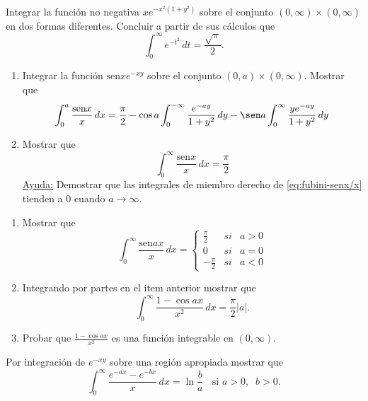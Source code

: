 \documentclass{book}
\begin{document}
\begin{ejer}{} 
Integrar la función no negativa $xe^{-x^2(1+y^2)}$ sobre el conjunto $(0,\infty)\times (0,\infty)$
en dos formas diferentes. Concluir a partir de sus cálculos que 
\[
\int_0^{\infty} e^{-t^2}\,dt=\frac{\sqrt{\pi}}{2}.
\]
\end{ejer}


\begin{ejer}{} 
\begin{enumerate}
\item Integrar la función $\text{sen} x e^{-xy}$ sobre el conjunto $(0,a)\times (0,\infty)$.
Mostrar que 
\begin{equation}\label{eq:fubini-senx/x}
\int_0^a \frac{\text{sen} x}{x}\,dx=
\frac{\pi}{2}-\cos a\int_0^{-\infty} \frac{e^{-ay}}{1+y^2}\,dy
-\sen a \int_0^{\infty} \frac{y e^{-ay}}{1+y^2}\,dy
\end{equation}
\item Mostrar que 
\[
\int_0^{\infty }\frac{\text{sen} x}{x}\,dx=\frac{\pi}{2}
\]
\underline{Ayuda:} 
Demostrar que las integrales de miembro derecho de \eqref{eq:fubini-senx/x} tienden a 0 cuando $a \to \infty$.
\end{enumerate} 
\end{ejer}


\begin{ejer}{}
\begin{enumerate}
\item Mostrar que
\[
\int_0^{\infty} \frac{\text{sen} a x}{x}\,dx= 
\left
\{\begin{array}{rll}
\frac{\pi}{2}&si&a>0
\\
0&si&a=0
\\
-\frac{\pi}{2}&si&a<0
\end{array}
\right.
\] 
\item Integrando por partes en el item anterior mostrar que
\[
\int_0^{\infty}\frac{1-\cos ax}{x^2}\,dx=\frac{\pi}{2}|a|.
\]
\item Probar que $\frac{1-\cos ax}{x^2}$ es una función integrable en $(0,\infty)$.
\end{enumerate}
\end{ejer}


\begin{ejer}{}
 Por integración de $e^{-xy}$ sobre una región apropiada mostrar que 
\[
\int_0^{\infty}\frac{e^{-ax}-e^{-bx}}{x}\,dx=\ln\frac{b}{a}\;\; \mbox{  si   }a>0, \;\;b>0.
\]
\end{ejer}
\end{document}
